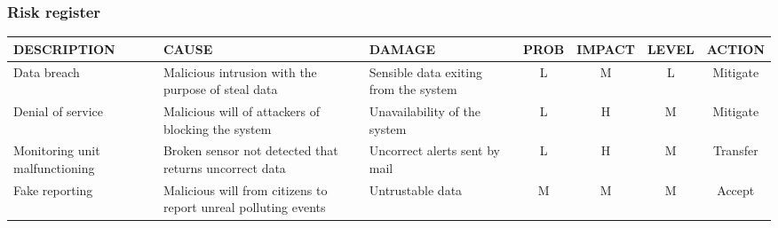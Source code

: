\subsubsection{Risk register}
\begin{table}[H]
    \centering
    
    \begin{tabularx}{\columnwidth}{|X|X|X|c|c|c|c|}
    \hline
    DESCRIPTION & CAUSE &  DAMAGE & PROB & IMPACT & LEVEL & ACTION \\ \hline
    Data breach & Malicious intrusion with the purpose of steal data & Sensible data exiting from the system & L & M & L & Mitigate \\ \hline
    Denial of service & Malicious will of attackers of blocking the system & Unavailability of the system & L & H & M & Mitigate \\ \hline
    Monitoring unit malfunctioning & Broken sensor not detected that returns uncorrect data & Uncorrect alerts sent by mail & L & H & M & Transfer \\ \hline
    Fake reporting & Malicious will from citizens to report unreal polluting events & Untrustable data & M & M & M & Accept \\ \hline
    
    \end{tabularx}
\end{table}